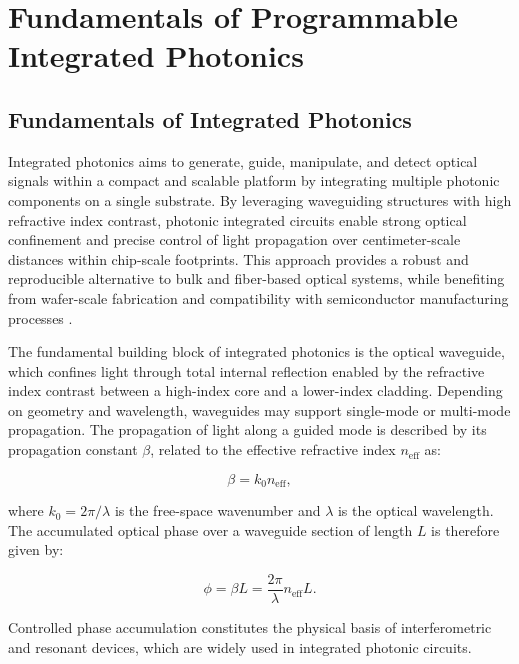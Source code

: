
\chapter{Fundamentals of Programmable Integrated Photonics} \label{chap:fundamentals}

\section{Fundamentals of Integrated Photonics} \label{sec:fundamentals-int_photonics}

Integrated photonics aims to generate, guide, manipulate, and detect optical signals within a 
compact and scalable platform by integrating multiple photonic components on a single substrate. 
By leveraging waveguiding structures with high refractive index contrast, photonic integrated 
circuits enable strong optical confinement and precise control of light propagation over 
centimeter-scale distances within chip-scale footprints. This approach provides a robust and 
reproducible alternative to bulk and fiber-based optical systems, while benefiting from wafer-scale 
fabrication and compatibility with semiconductor manufacturing processes 
\cite{sorefPresentFutureSilicon2006,thomsonRoadmapSiliconPhotonics2016}.

The fundamental building block of integrated photonics is the optical waveguide, which confines 
light through total internal reflection enabled by the refractive index contrast between a 
high-index core and a lower-index cladding. Depending on geometry and wavelength, waveguides may 
support single-mode or multi-mode propagation. The propagation of light along a guided mode is 
described by its propagation constant $\beta$, related to the effective refractive index 
$n_{\mathrm{eff}}$ as:

\begin{equation}
\beta = k_0 n_{\mathrm{eff}},
\end{equation}

where $k_0 = 2\pi / \lambda$ is the free-space wavenumber and $\lambda$ is the optical wavelength. 
The accumulated optical phase over a waveguide section of length $L$ is therefore given by:

\begin{equation}
\phi = \beta L = \frac{2\pi}{\lambda} n_{\mathrm{eff}} L.
\end{equation}

Controlled phase accumulation constitutes the physical basis of interferometric and resonant 
devices, which are widely used in integrated photonic circuits.

